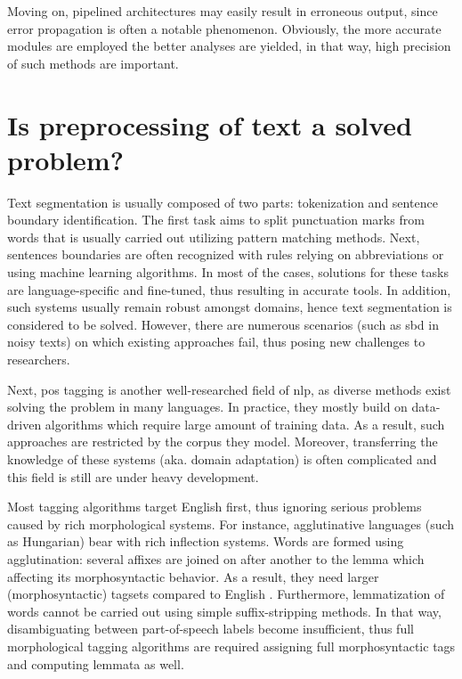 Moving on, pipelined architectures may easily result in erroneous output, since error propagation is often a notable phenomenon. 
Obviously, the more accurate modules are employed the better analyses are yielded, in that way, high precision of such methods are important.

\section{Is preprocessing of text a solved problem?}



Text segmentation is usually composed of two parts: tokenization and sentence boundary identification. 
The first task aims to split punctuation marks from words that is usually carried out utilizing pattern matching methods.
Next, sentences boundaries are often recognized with rules relying on abbreviations or using machine learning algorithms.
In most of the cases, solutions for these tasks are language-specific and fine-tuned, thus resulting in accurate tools.
In addition, such systems usually remain robust amongst domains, hence text segmentation is considered to be solved.
However, there are numerous scenarios (such as \acrshort{sbd} in noisy texts) on which existing approaches fail, thus posing new challenges to researchers.

Next, \acrshort{pos} tagging is another well-researched field of \acrshort{nlp}, as diverse methods exist solving the problem in many languages. 
In practice, they mostly build on data-driven algorithms which require large amount of training data.
As a result, such approaches are restricted by the corpus they model.
Moreover, transferring the knowledge of these systems (aka. domain adaptation) is often complicated and this field is still are under heavy development.

Most tagging algorithms target English first, thus ignoring serious problems caused by rich morphological systems.
For instance, agglutinative languages (such as Hungarian) bear with rich inflection systems.
Words are formed using agglutination: several affixes are joined on after another to the lemma which affecting its morphosyntactic behavior.
As a result, they need larger (morphosyntactic) tagsets compared to English . 
Furthermore, lemmatization of words cannot be carried out using simple suffix-stripping methods.
In that way, disambiguating between part-of-speech labels become insufficient, thus full morphological tagging algorithms are required assigning full morphosyntactic tags and computing lemmata as well.

